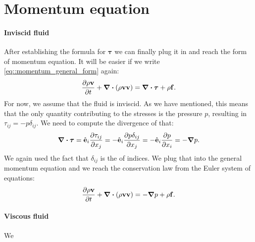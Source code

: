 \documentclass[a4paper]{article}
\begin{document}
\section{Momentum equation}
\paragraph{Inviscid fluid}
After establishing the formula for \(\bm{\tau}\) we can finally plug it in and
reach the  form of momentum equation. It will be easier if we write 
\autoref{eq::momentum_general_form} again:
\[
  \pdv{\rho \vb{v}}{t} 
  + \div{\qty(\rho\vb{v}\vb{v} )}  =
  \div\bm{\tau} + \rho\vb{f}.
\]
For now, we assume that the fluid is inviscid. As we have mentioned, this 
means that the only quantity contributing to the stresses is the pressure 
\(p\), resulting in \(\tau_{ij} = -p\delta_{ij}\). We need to compute the 
divergence of that:
\[
  \div{\bm{\tau}} 
  = \hat{\vb{e}}_i \pdv{\tau_{ij}}{x_j} 
  = - \hat{\vb{e}}_i \pdv{p \delta_{ij}}{x_j} 
  = - \hat{\vb{e}}_i \pdv{p}{x_i}
  = -\grad{p}.
\]
We again used the fact that \(\delta_{ij}\) is the  of indices.
We plug that into the general momentum equation and we reach the conservation law 
from the Euler system of equations:
\begin{equation}
  \pdv{\rho \vb{v}}{t} 
  + \div{\qty(\rho\vb{v}\vb{v} )}  =
  - \grad{p}
  + \rho\vb{f}.
\end{equation}

\paragraph{Viscous fluid}
We 
\end{document}
